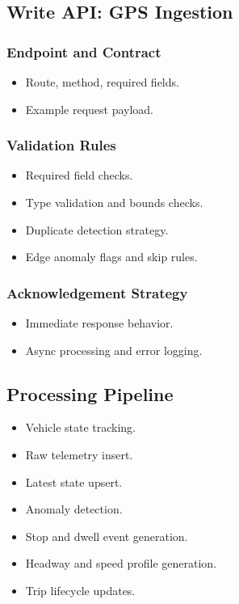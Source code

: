 \documentclass[12pt, a4paper]{article}
\begin{document}
\subsection{Write API: GPS Ingestion}
\subsubsection{Endpoint and Contract}
\begin{itemize}[leftmargin=*]
    \item Route, method, required fields.
    \item Example request payload.
\end{itemize}

\subsubsection{Validation Rules}
\begin{itemize}[leftmargin=*]
    \item Required field checks.
    \item Type validation and bounds checks.
    \item Duplicate detection strategy.
    \item Edge anomaly flags and skip rules.
\end{itemize}

\subsubsection{Acknowledgement Strategy}
\begin{itemize}[leftmargin=*]
    \item Immediate response behavior.
    \item Async processing and error logging.
\end{itemize}

\subsection{Processing Pipeline}
\begin{itemize}[leftmargin=*]
    \item Vehicle state tracking.
    \item Raw telemetry insert.
    \item Latest state upsert.
    \item Anomaly detection.
    \item Stop and dwell event generation.
    \item Headway and speed profile generation.
    \item Trip lifecycle updates.
\end{itemize}
\end{document}
